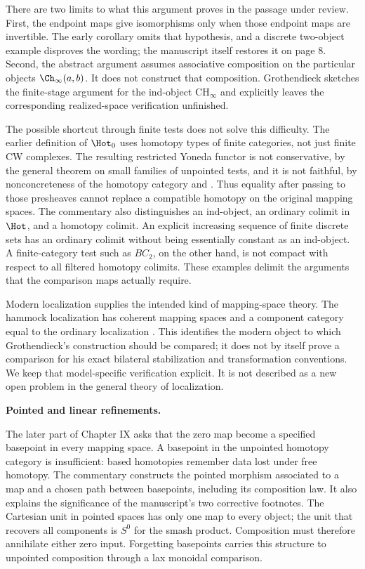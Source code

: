 There are two limits to what this argument proves in the passage under review. First, the endpoint maps give isomorphisms only when those endpoint maps are invertible. The early corollary omits that hypothesis, and a discrete two-object example disproves the wording; the manuscript itself restores it on page 8. Second, the abstract argument assumes associative composition on the particular objects $\Ch_\infty(a,b)$. It does not construct that composition. Grothendieck sketches the finite-stage argument for the ind-object $\mathrm{CH}_\infty$ and explicitly leaves the corresponding realized-space verification unfinished.

The possible shortcut through finite tests does not solve this difficulty. The earlier definition of $\Hot_0$ uses homotopy types of finite categories, not just finite CW complexes. The resulting restricted Yoneda functor is not conservative, by the general theorem on small families of unpointed tests, and it is not faithful, by nonconcreteness of the homotopy category \citep[Theorem~2.1]{ArlinChristensen2023} and \citet[pp.~1, 5 of the reprint]{Freyd1970}. Thus equality after passing to those presheaves cannot replace a compatible homotopy on the original mapping spaces. The commentary also distinguishes an ind-object, an ordinary colimit in $\Hot$, and a homotopy colimit. An explicit increasing sequence of finite discrete sets has an ordinary colimit without being essentially constant as an ind-object. A finite-category test such as $BC_2$, on the other hand, is not compact with respect to all filtered homotopy colimits. These examples delimit the arguments that the comparison maps actually require.

Modern localization supplies the intended kind of mapping-space theory. The hammock localization has coherent mapping spaces and a component category equal to the ordinary localization \citep[\S2]{DwyerKan1980Calculating}. This identifies the modern object to which Grothendieck's construction should be compared; it does not by itself prove a comparison for his exact bilateral stabilization and transformation conventions. We keep that model-specific verification explicit. It is not described as a new open problem in the general theory of localization.

\medskip\noindent\textbf{Pointed and linear refinements.}

The later part of Chapter IX asks that the zero map become a specified basepoint in every mapping space. A basepoint in the unpointed homotopy category is insufficient: based homotopies remember data lost under free homotopy. The commentary constructs the pointed morphism associated to a map and a chosen path between basepoints, including its composition law. It also explains the significance of the manuscript's two corrective footnotes. The Cartesian unit in pointed spaces has only one map to every object; the unit that recovers all components is $S^0$ for the smash product. Composition must therefore annihilate either zero input. Forgetting basepoints carries this structure to unpointed composition through a lax monoidal comparison.

